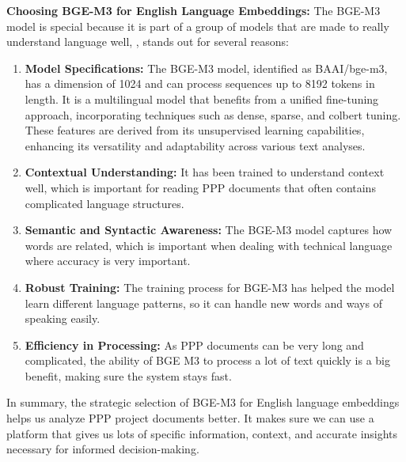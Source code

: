 \vskip 0.5cm
\textbf{Choosing BGE-M3 for English Language Embeddings:} The BGE-M3 model is special because it is part of a group of models that are made to really understand language well, , stands out for several reasons:%
\vskip 0.5cm
\begin{enumerate}
    \item \textbf{Model Specifications:} The BGE-M3 model, identified as BAAI/bge-m3, has a dimension of 1024 and can process sequences up to 8192 tokens in length. It is a multilingual model that benefits from a unified fine-tuning approach, incorporating techniques such as dense, sparse, and colbert tuning. These features are derived from its unsupervised learning capabilities, enhancing its versatility and adaptability across various text analyses.
\vskip 0.5cm
\item \textbf{Contextual Understanding:} It has been trained to understand context well, which is important for reading PPP documents that often contains complicated language structures.%
\vskip 0.5cm
\item \textbf{Semantic and Syntactic Awareness:} The BGE-M3 model captures how words are related, which is important when dealing with technical language where accuracy is very important.%
\vskip 0.5cm
\item \textbf{Robust Training:} The training process for BGE-M3 has helped the model learn different language patterns, so it can handle new words and ways of speaking easily.%
\vskip 0.5cm
\item \textbf{Efficiency in Processing:} As PPP documents can be very long and complicated, the ability of BGE M3 to process a lot of text quickly is a big benefit, making sure the system stays fast.%
\end{enumerate}
\vskip 0.5cm
In summary, the strategic selection of BGE-M3 for English language embeddings helps us analyze PPP project documents better. It makes sure we can use a platform that gives us lots of specific information, context, and accurate insights necessary for informed decision-making.
